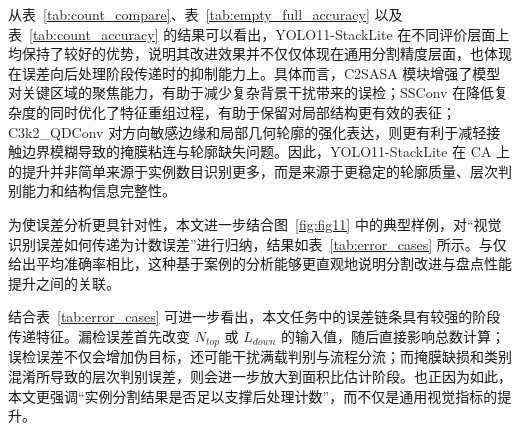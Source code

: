 从表~\ref{tab:count_compare}、表~\ref{tab:empty_full_accuracy} 以及表~\ref{tab:count_accuracy} 的结果可以看出，YOLO11-StackLite 在不同评价层面上均保持了较好的优势，说明其改进效果并不仅仅体现在通用分割精度层面，也体现在误差向后处理阶段传递时的抑制能力上。具体而言，C2SASA 模块增强了模型对关键区域的聚焦能力，有助于减少复杂背景干扰带来的误检；SSConv 在降低复杂度的同时优化了特征重组过程，有助于保留对局部结构更有效的表征；C3k2\_QDConv 对方向敏感边缘和局部几何轮廓的强化表达，则更有利于减轻接触边界模糊导致的掩膜粘连与轮廓缺失问题。因此，YOLO11-StackLite 在 CA 上的提升并非简单来源于实例数目识别更多，而是来源于更稳定的轮廓质量、层次判别能力和结构信息完整性。

为使误差分析更具针对性，本文进一步结合图~\ref{fig:fig11} 中的典型样例，对“视觉识别误差如何传递为计数误差”进行归纳，结果如表~\ref{tab:error_cases} 所示。与仅给出平均准确率相比，这种基于案例的分析能够更直观地说明分割改进与盘点性能提升之间的关联。

\begin{table}[htbp]
  \label{tab:error_cases}
  \centering
  \small
\end{table}

结合表~\ref{tab:error_cases} 可进一步看出，本文任务中的误差链条具有较强的阶段传递特征。漏检误差首先改变 $N_{\mathit{top}}$ 或 $L_{\mathit{down}}$ 的输入值，随后直接影响总数计算；误检误差不仅会增加伪目标，还可能干扰满载判别与流程分流；而掩膜缺损和类别混淆所导致的层次判别误差，则会进一步放大到面积比估计阶段。也正因为如此，本文更强调“实例分割结果是否足以支撑后处理计数”，而不仅是通用视觉指标的提升。

